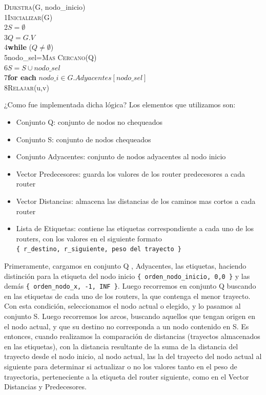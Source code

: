 \documentclass[12pt]{article} %
\begin{document}
\begin{leftbar}
\textsc{Dijkstra}(G, nodo\_inicio)\\
1\indent	\textsc{Inicializar}(G)\\
2\indent	$S=\emptyset$\\
3\indent	$Q=G.V$\\
4\indent	\textbf{while} ($Q\neq\emptyset$)\\
5\indent\indent		nodo\_sel=\textsc{Mas Cercano}(Q)\\
6\indent\indent		$S=S\cup nodo\_sel$\\
7\indent\indent		\textbf{for each} $nodo\_i \in G.Adyacentes[nodo\_sel]$\\
8\indent\indent\indent			\textsc{Relajar}(u,v) 
\end{leftbar}

¿Como fue implementada dicha lógica?  Los elementos  que utilizamos son:
\begin{itemize}
\item Conjunto Q: conjunto de nodos no chequeados
\item Conjunto S: conjunto de nodos chequeados
\item Conjunto Adyacentes: conjunto de nodos adyacentes al nodo inicio
\item Vector Predecesores: guarda los valores de los router predecesores a cada router
\item Vector Distancias: almacena las distancias de los caminos mas cortos a cada router
\item Lista de Etiquetas: contiene las etiquetas correspondiente a cada uno de los routers, con los valores en el siguiente formato \\
\verb+{ r_destino, r_siguiente, peso del trayecto }+
\end{itemize}

Primeramente, cargamos en conjunto Q , Adyacentes, las etiquetas, haciendo distinción para la etiqueta del nodo inicio \verb+{ orden_nodo_inicio, 0,0 }+ y las demás \verb+{ orden_nodo_x, -1, INF }+.
Luego recorremos en conjunto Q buscando en las etiquetas de cada uno de los routers, la que contenga el menor trayecto. Con esta condición, seleccionamos el nodo actual o elegido, y lo pasamos al conjunto S.
Luego recorremos los arcos, buscando aquellos que tengan origen en el nodo actual, y que su destino no corresponda a un nodo contenido en S. 
Es entonces, cuando realizamos la comparación de distancias (trayectos almacenados en las etiquetas), con la distancia resultante de la suma de la distancia del trayecto desde el nodo inicio, al nodo actual, las la del trayecto del nodo actual al siguiente para determinar si actualizar o no los valores tanto en el peso de trayectoria, perteneciente a la etiqueta del router siguiente,  como en el Vector Distancias y Predecesores.
\end{document}
